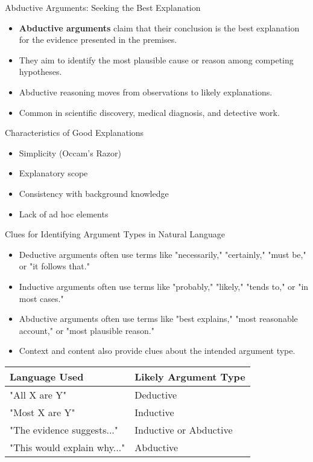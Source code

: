 \documentclass{beamer}
\begin{document}
\begin{frame}{Abductive Arguments: Seeking the Best Explanation}
    \begin{itemize}
        \item \textbf{Abductive arguments} claim that their conclusion is the best explanation for the evidence presented in the premises.
        \item They aim to identify the most plausible cause or reason among competing hypotheses.
        \item Abductive reasoning moves from observations to likely explanations.
        \item Common in scientific discovery, medical diagnosis, and detective work.
    \end{itemize}
    
    \begin{block}{Characteristics of Good Explanations}
        \begin{itemize}
            \item Simplicity (Occam's Razor)
            \item Explanatory scope
            \item Consistency with background knowledge
            \item Lack of ad hoc elements
        \end{itemize}
    \end{block}
\end{frame}

\begin{frame}{Clues for Identifying Argument Types in Natural Language}
    \begin{itemize}
        \item Deductive arguments often use terms like "necessarily," "certainly," "must be," or "it follows that."
        \item Inductive arguments often use terms like "probably," "likely," "tends to," or "in most cases."
        \item Abductive arguments often use terms like "best explains," "most reasonable account," or "most plausible reason."
        \item Context and content also provide clues about the intended argument type.
    \end{itemize}
    
    \begin{table}
        \centering
        \begin{tabular}{|l|l|}
            \hline
            \textbf{Language Used} & \textbf{Likely Argument Type} \\
            \hline
            "All X are Y" & Deductive \\
            "Most X are Y" & Inductive \\
            "The evidence suggests..." & Inductive or Abductive \\
            "This would explain why..." & Abductive \\
            \hline
        \end{tabular}
    \end{table}
\end{frame}
\end{document}
